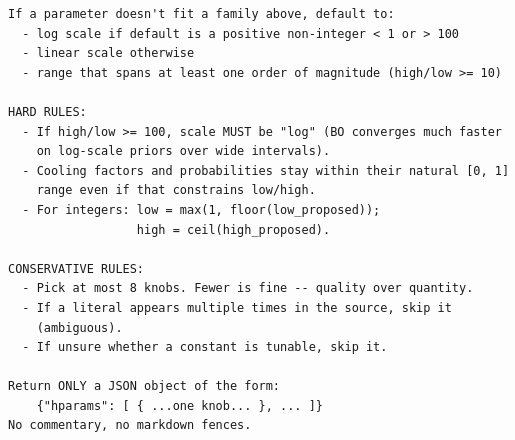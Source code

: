 \begin{verbatim}
If a parameter doesn't fit a family above, default to:
  - log scale if default is a positive non-integer < 1 or > 100
  - linear scale otherwise
  - range that spans at least one order of magnitude (high/low >= 10)

HARD RULES:
  - If high/low >= 100, scale MUST be "log" (BO converges much faster
    on log-scale priors over wide intervals).
  - Cooling factors and probabilities stay within their natural [0, 1]
    range even if that constrains low/high.
  - For integers: low = max(1, floor(low_proposed));
                  high = ceil(high_proposed).

CONSERVATIVE RULES:
  - Pick at most 8 knobs. Fewer is fine -- quality over quantity.
  - If a literal appears multiple times in the source, skip it
    (ambiguous).
  - If unsure whether a constant is tunable, skip it.

Return ONLY a JSON object of the form:
    {"hparams": [ { ...one knob... }, ... ]}
No commentary, no markdown fences.
\end{verbatim}
\normalsize
